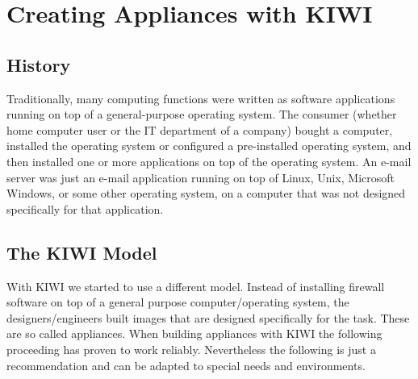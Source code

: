 \chapter{Creating Appliances with KIWI}
\label{chapter:appliance}
\minitoc

\section{History}
Traditionally, many computing functions were written as software applications
running on top of a general-purpose operating system. The consumer
(whether home computer user or the IT department of a company) bought a
computer, installed the operating system or configured a pre-installed
operating system, and then installed one or more applications on top of
the operating system. An e-mail server was just an e-mail application
running on top of Linux, Unix, Microsoft Windows, or some other operating
system, on a computer that was not designed specifically for that application.

\section{The KIWI Model}
With KIWI we started to use a different model. Instead of installing
firewall software on top of a general purpose computer/operating system,
the designers/engineers built images that are designed specifically for
the task. These are so called appliances.
When building appliances with KIWI the following proceeding has proven
to work reliably. Nevertheless the following is just a recommendation
and can be adapted to special needs and environments.

